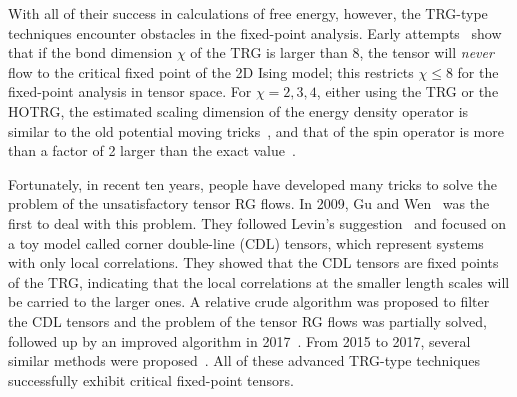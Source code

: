 \documentclass[aps,prr,reprint,superscriptaddress,floatfix]{revtex4-2}
\begin{document}
With all of their success in calculations of free energy, however, the TRG-type techniques encounter obstacles in the fixed-point analysis. 
Early attempts~\cite{Berker2008,aoki2009,meurice2013,kadanoff2014} show that if the bond dimension $\chi$ of the TRG is larger than 8, the tensor will \textit{never} flow to the critical fixed point of the 2D Ising model; this restricts $\chi \leq 8$ for the fixed-point analysis in tensor space.
For $\chi = 2, 3, 4$, either using the TRG or the HOTRG, the estimated scaling dimension of the energy density operator is similar to the old potential moving tricks~\cite{Berker2008,aoki2009,meurice2013}, and that of the spin operator is more than a factor of 2 larger than the exact value~\cite{kadanoff2014}. 
%

Fortunately, in recent ten years, people have developed many tricks to solve the problem of the unsatisfactory tensor RG flows.
In 2009, Gu and Wen~\cite{GuWen2009} was the first to deal with this problem. 
They followed Levin's suggestion~\cite{trg,LevinTalk} and focused on a toy model called corner double-line (CDL) tensors, which represent systems with only local correlations. 
They showed that the CDL tensors are fixed points of the TRG, indicating that the local correlations at the smaller length scales will be carried to the larger ones. 
A relative crude algorithm was proposed to filter the CDL tensors and the problem of the tensor RG flows was partially solved, followed up by an improved algorithm in 2017~\cite{looptnr}. 
From 2015 to 2017, several similar methods were proposed~\cite{tnr,tnralgo,tnrplus}. 
All of these advanced TRG-type techniques successfully exhibit critical fixed-point tensors. 
%
\end{document}

